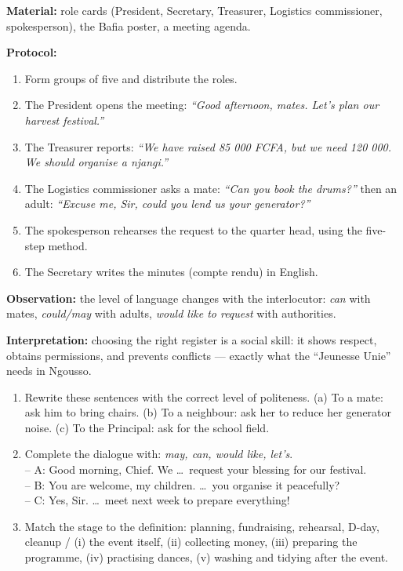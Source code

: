 \documentclass[11pt]{article}
\begin{document}
\begin{experience}
\textbf{Material:} role cards (President, Secretary, Treasurer, Logistics commissioner, spokesperson), the Bafia poster, a meeting agenda.

\textbf{Protocol:}
\begin{enumerate}
\item Form groups of five and distribute the roles.
\item The President opens the meeting: \emph{``Good afternoon, mates. Let's plan our harvest festival.''}
\item The Treasurer reports: \emph{``We have raised 85 000 FCFA, but we need 120 000. We should organise a njangi.''}
\item The Logistics commissioner asks a mate: \emph{``Can you book the drums?''} then an adult: \emph{``Excuse me, Sir, could you lend us your generator?''}
\item The spokesperson rehearses the request to the quarter head, using the five-step method.
\item The Secretary writes the minutes (compte rendu) in English.
\end{enumerate}

\textbf{Observation:} the level of language changes with the interlocutor: \emph{can} with mates, \emph{could/may} with adults, \emph{would like to request} with authorities.

\textbf{Interpretation:} choosing the right register is a social skill: it shows respect, obtains permissions, and prevents conflicts — exactly what the ``Jeunesse Unie'' needs in Ngousso.
\end{experience}

\begin{exercice}
\begin{enumerate}
\item Rewrite these sentences with the correct level of politeness. (a) To a mate: ask him to bring chairs. (b) To a neighbour: ask her to reduce her generator noise. (c) To the Principal: ask for the school field.
\item Complete the dialogue with: \emph{may, can, would like, let's}.\\
-- A: Good morning, Chief. We \ldots\ request your blessing for our festival.\\
-- B: You are welcome, my children. \ldots\ you organise it peacefully?\\
-- C: Yes, Sir. \ldots\ meet next week to prepare everything!
\item Match the stage to the definition: planning, fundraising, rehearsal, D-day, cleanup / (i) the event itself, (ii) collecting money, (iii) preparing the programme, (iv) practising dances, (v) washing and tidying after the event.
\end{enumerate}
\end{exercice}
\end{document}
